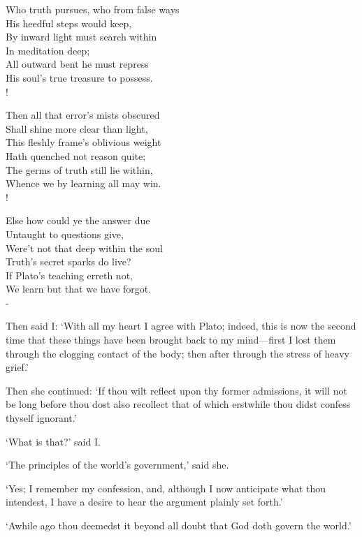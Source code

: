 \documentclass[12pt]{book}
\newenvironment{vpoem}[1]%
  {\def\poemvsindentlines{#1}\begin{poem}\small}%
  {\end{poem}\def\poemvsindentlines{\relax}}
\begin{document}
\begin{vpoem}{24}
    Who truth pursues, who from false ways \\
      His heedful steps would keep, \\
    By inward light must search within \\
      In meditation deep; \\
    All outward bent he must repress \\
    His soul's true treasure to possess. \\!

    Then all that error's mists obscured \\
      Shall shine more clear than light, \\
    This fleshly frame's oblivious weight \\
      Hath quenched not reason quite; \\
    The germs of truth still lie within, \\
    Whence we by learning all may win. \\!

    Else how could ye the answer due \\
      Untaught to questions give, \\
    Were't not that deep within the soul \\
      Truth's secret sparks do live? \\
    If Plato's teaching erreth not, \\
    We learn but that we have forgot. \\-
\end{vpoem}

Then said I: `With all my heart I agree with Plato; indeed, this is now
the second time that these things have been brought back to my
mind---first I lost them through the clogging contact of the body; then
after through the stress of heavy grief.'

Then she continued: `If thou wilt reflect upon thy former admissions, it
will not be long before thou dost also recollect that of which erstwhile
thou didst confess thyself ignorant.'

`What is that?' said I.

`The principles of the world's government,' said she.

`Yes; I remember my confession, and, although I now anticipate what thou
intendest, I have a desire to hear the argument plainly set forth.'

`Awhile ago thou deemedst it beyond all doubt that God doth govern the
world.'
\end{document}
